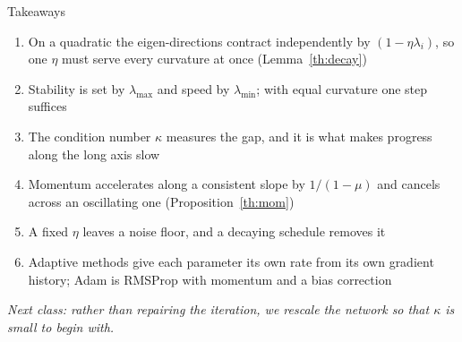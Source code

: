 \documentclass[aspectratio=169, 11pt]{beamer}
\newcommand{\bridge}[1]{%
  {\scriptsize\itshape\color{mcMuted} #1\par}\vspace{0.35em}}
\begin{document}
\begin{frame}{Takeaways}
  \vspace{0.15em}
  \vspace{-0.15em}
  {\footnotesize
  \begin{enumerate}\itemsep0.30em
    \item On a quadratic the eigen-directions contract independently by
          $(1-\eta\lambda_i)$, so one $\eta$ must serve every curvature
          at once (Lemma~\ref{th:decay})
    \item Stability is set by $\lambda_{\max}$ and speed by
          $\lambda_{\min}$; with equal curvature one step suffices
    \item The condition number $\kappa$ measures the gap, and it is what
          makes progress along the long axis slow
    \item Momentum accelerates along a consistent slope by $1/(1-\mu)$
          and cancels across an oscillating one
          (Proposition~\ref{th:mom})
    \item A fixed $\eta$ leaves a noise floor, and a decaying schedule
          removes it
    \item Adaptive methods give each parameter its own rate from its
          own gradient history; Adam is RMSProp with momentum and a
          bias correction
  \end{enumerate}}
  \vspace{0.2em}
  \bridge{Next class: rather than repairing the iteration, we rescale
  the network so that $\kappa$ is small to begin with.}
\end{frame}
\end{document}
